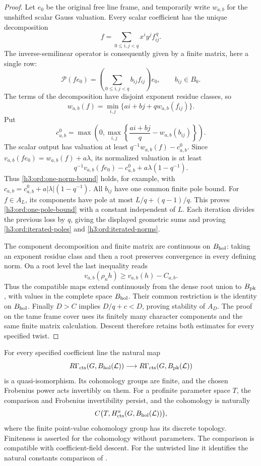 \begin{proof}
Let $e_0$ be the original free line frame, and temporarily write
$w_{a,b}$ for the unshifted scalar Gauss valuation.  Every scalar
coefficient has the unique decomposition
\[
 f=\sum_{0\leq i,j<q}x^iy^j f_{ij}^{\,q}.
\]
The inverse-semilinear operator is consequently given by a finite
matrix, here a single row:
\[
 \mathcal P(fe_0)=\left(\sum_{0\leq i,j<q} b_{ij}f_{ij}\right)e_0,
 \qquad b_{ij}\in B_0.
\]
The terms of the decomposition have disjoint exponent residue classes,
so
\[
 w_{a,b}(f)=\min_{i,j}\{ai+bj+qw_{a,b}(f_{ij})\}.
\]
Put
\[
 c^0_{a,b}=\max\left(0,
      \max_{i,j}\left\{\frac{ai+bj}{q}-w_{a,b}(b_{ij})\right\}\right).
\]
The scalar output has valuation at least
$q^{-1}w_{a,b}(f)-c^0_{a,b}$.
Since $v_{a,b}(fe_0)=w_{a,b}(f)+a\lambda$, its normalized
valuation is at least
\[
 q^{-1}v_{a,b}(fe_0)-c^0_{a,b}+a\lambda(1-q^{-1}).
\]
Thus \eqref{h3:ord:one-norm-bound} holds, for example, with
$c_{a,b}=c^0_{a,b}+a|\lambda|(1-q^{-1})$.
All $b_{ij}$ have one common finite pole bound.
For $f\in A_L$, its components have pole at most
$L/q+(q-1)/q$.  This proves \eqref{h3:ord:one-pole-bound} with a
constant independent of $L$.
Each iteration divides the previous loss by $q$, giving the displayed
geometric sums and proving \eqref{h3:ord:iterated-poles} and
\eqref{h3:ord:iterated-norms}.

The component decomposition and finite matrix are continuous on
$B_{\mathrm{hol}}$: taking an exponent residue class and then a root
preserves convergence in every defining norm.  On a root level the
last inequality reads
\[
 v_{a,b}(\rho_n h)\geq v_{a,b}(h)-C_{a,b}.
\]
Thus the compatible maps extend continuously from the dense root
union to $B_{\mathrm{pk}}$, with values in the complete space $B_{\mathrm{hol}}$.
Their common restriction is the identity on $B_{\mathrm{hol}}$.
Finally $D>C$ implies $D/q+c<D$, proving stability of $A_D$.
The proof on the tame frame cover uses its finitely many character
components and the same finite matrix calculation.  Descent therefore
retains both estimates for every specified twist.
\end{proof}

\begin{proposition}\label{h3:prop:holomorphic-comparison}
For every specified coefficient line the natural map
\[
 R\Gamma_{\mathrm{cts}}(G,B_{\mathrm{hol}}(\mathcal L))
   \longrightarrow R\Gamma_{\mathrm{cts}}(G,B_{\mathrm{pk}}(\mathcal L))
\]
is a quasi-isomorphism.  Its cohomology groups are finite, and the
chosen Frobenius power acts invertibly on them.  For a profinite
parameter space $T$, the comparison and Frobenius invertibility persist,
and the cohomology is naturally
\[
 C\bigl(T,H^a_{\mathrm{cts}}(G,B_{\mathrm{hol}}(\mathcal L))\bigr),
\]
where the finite point-value cohomology group has its discrete topology.
Finiteness is asserted for the cohomology without parameters.
The comparison is compatible with coefficient-field descent.
For the untwisted line it identifies
the natural constants comparison of .
\end{proposition}

